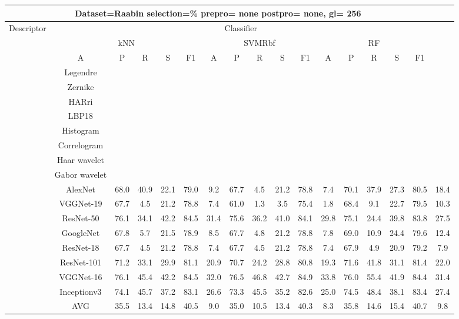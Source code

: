 \documentclass[12pt,italian]{article}
\begin{document}
\begin{tiny}
 \pagebreak 
\begin{longtable}{lcccccccccccccccc}
\toprule
\multicolumn{16}{c}{Dataset=Raabin selection=\% prepro= none postpro= none, gl= 256} \\ 
\toprule
Descriptor & \multicolumn{15}{c}{Classifier} \\ 
& \multicolumn{5}{c}{kNN} & \multicolumn{5}{c}{SVMRbf} & \multicolumn{5}{c}{RF} \\ 
& A & P & R & S & F1 & A & P & R & S & F1 & A & P & R & S & F1 \\ 
\midrule
& Legendre \\ 
& Zernike \\ 
& HARri \\ 
& LBP18 \\ 
& Histogram \\ 
& Correlogram \\ 
& Haar wavelet \\ 
& Gabor wavelet \\ 
& AlexNet & 68.0 & 40.9 & 22.1 & 79.0 &  9.2 & 67.7 &  4.5 & 21.2 & 78.8 &  7.4 & 70.1 & 37.9 & 27.3 & 80.5 & 18.4 \\ 
& VGGNet-19 & 67.7 &  4.5 & 21.2 & 78.8 &  7.4 & 61.0 &  1.3 &  3.5 & 75.4 &  1.8 & 68.4 &  9.1 & 22.7 & 79.5 & 10.3 \\ 
& ResNet-50 & 76.1 & 34.1 & 42.2 & 84.5 & 31.4 & 75.6 & 36.2 & 41.0 & 84.1 & 29.8 & 75.1 & 24.4 & 39.8 & 83.8 & 27.5 \\ 
& GoogleNet & 67.8 &  5.7 & 21.5 & 78.9 &  8.5 & 67.7 &  4.8 & 21.2 & 78.8 &  7.8 & 69.0 & 10.9 & 24.4 & 79.6 & 12.4 \\ 
& ResNet-18 & 67.7 &  4.5 & 21.2 & 78.8 &  7.4 & 67.7 &  4.5 & 21.2 & 78.8 &  7.4 & 67.9 &  4.9 & 20.9 & 79.2 &  7.9 \\ 
& ResNet-101 & 71.2 & 33.1 & 29.9 & 81.1 & 20.9 & 70.7 & 24.2 & 28.8 & 80.8 & 19.3 & 71.6 & 41.8 & 31.1 & 81.4 & 22.0 \\ 
& VGGNet-16 & 76.1 & 45.4 & 42.2 & 84.5 & 32.0 & 76.5 & 46.8 & 42.7 & 84.9 & 33.8 & 76.0 & 55.4 & 41.9 & 84.4 & 31.4 \\ 
& Inceptionv3 & 74.1 & 45.7 & 37.2 & 83.1 & 26.6 & 73.3 & 45.5 & 35.2 & 82.6 & 25.0 & 74.5 & 48.4 & 38.1 & 83.4 & 27.4 \\ 
\hline
& AVG & 35.5 & 13.4 & 14.8 & 40.5 &  9.0 & 35.0 & 10.5 & 13.4 & 40.3 &  8.3 & 35.8 & 14.6 & 15.4 & 40.7 &  9.8 \\ 
\hline
\bottomrule
\end{longtable} 

 \pagebreak 
\end{tiny} 
 
\end{document}
